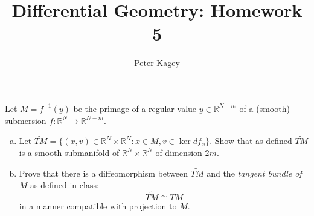 \documentclass{article}
\newenvironment{problem}[2][Problem]{\begin{trivlist}
\item[\hskip \labelsep {\bfseries #1}\hskip \labelsep {\bfseries #2.}]}{\end{trivlist}}
\begin{document}
\title{Differential Geometry: Homework 5}
\author{Peter Kagey}

\maketitle

\begin{problem}{1}
  Let $M = f^{-1}(y)$ be the primage of a regular value
  $y \in \mathbb{R}^{N - m}$ of a (smooth) submersion
  $f\colon \mathbb{R}^N \rightarrow \mathbb{R}^{N-m}$.
  \begin{enumerate}[(a)]
    \item Let $
      \widetilde{TM} =
      \{(x, v) \in \mathbb{R}^N \times \mathbb{R}^N : x \in M, v \in \ker df_x\}
    $. Show that as defined $\widetilde{TM}$ is a smooth submanifold of
    $\mathbb{R}^N \times \mathbb{R}^N$ of dimension $2m$.
    \item Prove that there is a diffeomorphism between $\widetilde{TM}$ and the
      \textit{tangent bundle of $M$}  as defined in class: \[
        \widetilde{TM} \cong TM
      \] in a manner compatible with projection to $M$.
  \end{enumerate}
\end{problem}
\end{document}

